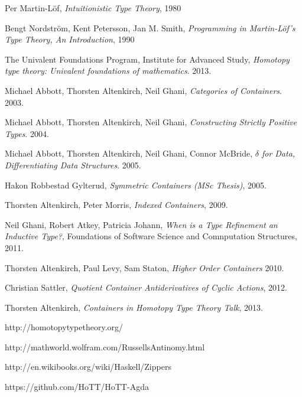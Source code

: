\documentclass[12pt]{report}
\begin{document}
\cleardoublepage
{}
{}

\begin{thebibliography}{10}

  Per Martin-L\"of,
  \emph{Intuitionistic Type Theory},
  1980

  Bengt Nordstr\"om, Kent Petersson, Jan M. Smith,
  \emph{Programming in Martin-L\"of's Type Theory, An Introduction},
  1990

  The Univalent Foundations Program, Institute for Advanced Study,
  \emph{Homotopy type theory: Univalent foundations of mathematics}.
  2013.

  Michael Abbott, Thorsten Altenkirch, Neil Ghani,
  \emph{Categories of Containers}.
  2003.

  Michael Abbott, Thorsten Altenkirch, Neil Ghani,
  \emph{Constructing Strictly Positive Types}.
  2004.
  
  Michael Abbott, Thorsten Altenkirch, Neil Ghani, Connor McBride,
  \emph{$\delta$ for Data, Differentiating Data Structures}.
  2005.

  Hakon Robbestad Gylterud,
  \emph{Symmetric Containers (MSc Thesis)},
  2005.
  
  Thorsten Altenkirch, Peter Morris,
  \emph{Indexed Containers},
  2009.
  
  Neil Ghani, Robert Atkey, Patricia Johann,
  \emph{When is a Type Refinement an Inductive Type?},
  Foundations of Software Science and Comnputation Structures,
  2011.
  
  Thorsten Altenkirch, Paul Levy, Sam Staton,
  \emph{Higher Order Containers}
  2010.
  
  Christian Sattler,
  \emph{Quotient Container Antiderivatives of Cyclic Actions},
  2012.
  
  Thorsten Altenkirch,
  \emph{Containers in Homotopy Type Theory Talk},
  2013.
  
  http://homotopytypetheory.org/
  
  http://mathworld.wolfram.com/RussellsAntinomy.html
  
  http://en.wikibooks.org/wiki/Haskell/Zippers
  
  https://github.com/HoTT/HoTT-Agda

\end{thebibliography}
\cleardoublepage
{}
{}
\end{document}

